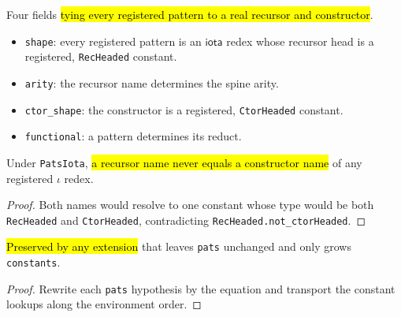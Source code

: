 \begin{definition}
\label{structure:indparams-patsiota}
\leanok
{} 

 Four fields \hl{tying every registered pattern to a real recursor and
constructor}.
\begin{itemize}
\item \texttt{shape}: every registered pattern is an $\mathsf{iota}$ redex whose recursor
head is a registered, \texttt{RecHeaded} constant.
\item \texttt{arity}: the recursor name determines the spine arity.
\item \texttt{ctor\_shape}: the constructor is a registered, \texttt{CtorHeaded} constant.
\item \texttt{functional}: a pattern determines its reduct.
\end{itemize}
\end{definition}

\begin{theorem}
\label{thm:indparams-patsiota-rec-ne-ctor}
\leanok
{} 

 Under \texttt{PatsIota}, \hl{a recursor name never equals a constructor
name} of any registered $\iota$ redex.
\end{theorem}
\begin{proof}
\leanok
{} Both names would resolve to one constant whose type would be both
\texttt{RecHeaded} and \texttt{CtorHeaded}, contradicting \texttt{RecHeaded.not\_ctorHeaded}.
\end{proof}

\begin{lemma}
\label{thm:indparams-patsiota-of-le}
\leanok
{} 

 \hl{Preserved by any extension} that leaves \texttt{pats} unchanged and only
grows \texttt{constants}.
\end{lemma}
\begin{proof}
\leanok
{} Rewrite each \texttt{pats} hypothesis by the equation and transport the constant
lookups along the environment order.
\end{proof}

